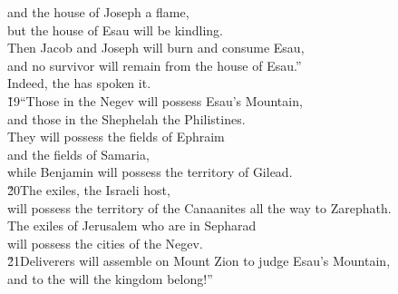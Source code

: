 \begin{poetry}
\poeml and the house of Joseph a flame, \\
\poemll    but the house of Esau will be kindling. \\
\poeml Then Jacob and Joseph will burn and consume Esau, \\
\poemll    and no survivor will remain from the house of Esau.'' \\
\poeml Indeed, the  has spoken it. \\
\poeml \v{19}``Those in the Negev will possess Esau's Mountain, \\
\poemll    and those in the Shephelah the Philistines. \\
\poeml They will possess the fields of Ephraim \\
\poemll    and the fields of Samaria, \\
\poeml while Benjamin will possess the territory of Gilead. \\
\poeml \v{20}The exiles, the Israeli host, \\
\poemll    will possess the territory of the Canaanites all the way to Zarephath. \\
\poeml The exiles of Jerusalem who are in Sepharad \\
\poemll    will possess the cities of the Negev. \\
\poeml \v{21}Deliverers will assemble on Mount Zion to judge Esau's Mountain, \\
\poemll    and to the  will the kingdom belong!''\end{poetry}
